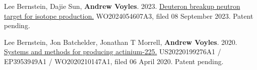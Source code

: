 \begin{bibsection}

\item Lee Bernstein, Dajie Sun, \textbf{Andrew Voyles}. 2023. \href{https://patents.google.com/patent/WO2024054607A3/en}{Deuteron breakup neutron target for isotope production.} WO2024054607A3, filed 08 September 2023. Patent pending.

\item Lee Bernstein, Jon Batchelder, Jonathan T Morrell, \textbf{Andrew Voyles}. 2020. \href{https://patents.google.com/patent/US20220199276A1/en}{Systems and methods for producing actinium-225.} US20220199276A1 / EP3953949A1 / WO2020210147A1, filed 06 April 2020. Patent pending.












\end{bibsection}

